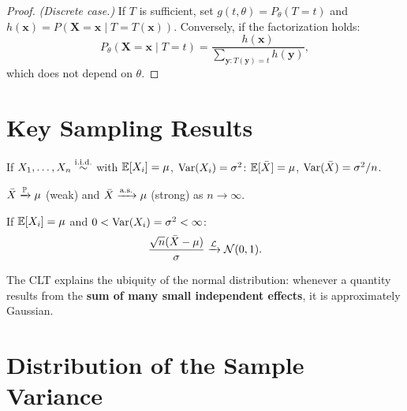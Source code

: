 \begin{proof}
\textit{(Discrete case.)} If $T$ is sufficient, set $g(t,\theta)=P_\theta(T=t)$ and $h(\mathbf{x})=P(\mathbf{X}=\mathbf{x}\mid T=T(\mathbf{x}))$. Conversely, if the factorization holds:
\[
P_\theta(\mathbf{X}=\mathbf{x}\mid T=t) = \frac{h(\mathbf{x})}{\sum_{\mathbf{y}:T(\mathbf{y})=t} h(\mathbf{y})},
\]
which does not depend on $\theta$.
\end{proof}

\section{Key Sampling Results}

\begin{theorem}
If $X_1,\ldots,X_n \overset{\text{i.i.d.}}{\sim}$ with $\mathbb{E}[X_i]=\mu$, $\operatorname{Var}(X_i)=\sigma^2$: $\mathbb{E}[\bar{X}]=\mu$, $\operatorname{Var}(\bar{X})=\sigma^2/n$.
\end{theorem}

\begin{theorem}
$\bar{X} \xrightarrow{\mathbb{P}} \mu$ (weak) and $\bar{X} \xrightarrow{\text{a.s.}} \mu$ (strong) as $n\to\infty$.
\end{theorem}

\begin{theorem}
\label{thm:clt}
If $\mathbb{E}[X_i]=\mu$ and $0<\operatorname{Var}(X_i)=\sigma^2<\infty$:
\[
\frac{\sqrt{n}(\bar{X}-\mu)}{\sigma} \xrightarrow{\mathcal{L}} \mathcal{N}(0,1).
\]
\end{theorem}

\begin{intuition}
The CLT explains the ubiquity of the normal distribution: whenever a quantity results from the \textbf{sum of many small independent effects}, it is approximately Gaussian.
\end{intuition}

\begin{center}
\end{center}

\section{Distribution of the Sample Variance}

